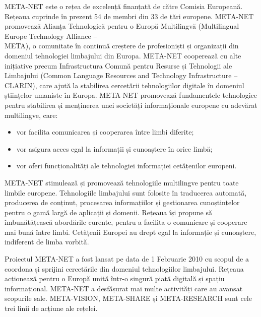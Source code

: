 \begin{multicols}{2}

META-NET este o rețea de excelență finanțată de către Comisia Europeană. Rețeaua cuprinde în prezent 54 de membri din 33 de țări europene\cite{rehm2011}. META-NET promovează Alianța Tehnologică pentru o Europă Multilingvă (Multilingual Europe Technology Alliance --\\ META), o comunitate în continuă creștere de profesioniști și organizații din domeniul tehnologiei limbajului din Europa. META-NET cooperează cu alte inițiative precum Infrastructura Comună pentru Resurse și Tehnologii ale Limbajului (Common Language Resources and Technology Infrastructure -- CLARIN), care ajută la stabilirea cercetării tehnologiilor digitale în domeniul științelor umaniste în Europa. META-NET promovează fundamentele tehnologice pentru stabilirea și menținerea unei societăți informaționale europene cu adevărat multilingve, care:

\begin{itemize}
\item vor facilita comunicarea și cooperarea între limbi diferite;
\item vor asigura acces egal la informații și cunoaștere în orice limbă;
\item vor oferi funcționalități ale tehnologiei informației cetățenilor europeni.
\end{itemize}

META-NET stimulează și promovează tehnologiile multilingve pentru toate limbile europene. Tehnologiile limbajului sunt folosite în traducerea automată, producerea de conținut, procesarea informațiilor și gestionarea cunoștințelor pentru o gamă largă de aplicații și domenii. Rețeaua își propune să îmbunătățească abordările curente, pentru a facilita o comunicare și cooperare mai bună între limbi. Cetățenii Europei au drept egal la informație și cunoaștere, indiferent de limba vorbită.

Proiectul META-NET a fost lansat pe data de 1 Februarie 2010 cu scopul de a coordona și sprijini cercetările din domeniul tehnologiilor limbajului. Rețeaua acționează pentru o Europă unită într-o singură piață digitală și spațiu informațional. META-NET a desfășurat mai multe activități care au avansat scopurile sale. META-VISION, META-SHARE și META-RESEARCH sunt cele trei linii de acțiune ale rețelei.


\end{multicols}
